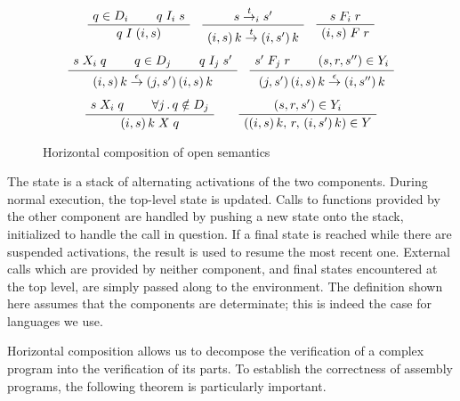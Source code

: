 \documentclass[acmsmall,authordraft]{acmart}
\begin{document}
\begin{figure} %
    \begin{gather*}
        \AxiomC{$q \in D_i$}
        \AxiomC{$q \mathrel{I_i} s$}
        \BinaryInfC{$q \mathrel{I} (i, s)$}
        \DisplayProof
        \quad
        \AxiomC{$s \stackrel{t}{\rightarrow}_i s'$}
        \UnaryInfC{$
            (i, s) \, k
            \stackrel{t}{\rightarrow}
            (i, s') \, k$}
        \DisplayProof
        \quad
        \AxiomC{$s \mathrel{F_i} r$}
        \UnaryInfC{$(i, s) \mathrel{F} r$}
        \DisplayProof
        \\[1ex]
        \AxiomC{$s \mathrel{X_i} q$}
        \AxiomC{$q \in D_j$}
        \AxiomC{$q \mathrel{I_j} s'$}
        \TrinaryInfC{$
            (i, s) \, k
            \stackrel{\epsilon}{\rightarrow}
            (j, s') \, (i, s) \, k$}
        \DisplayProof
        \quad
        \AxiomC{$s' \mathrel{F_j} r$}
        \AxiomC{$(s, r, s'') \in Y_i$}
        \BinaryInfC{$
            (j, s') \, (i, s) \, k
            \stackrel{\epsilon}{\rightarrow}
            (i, s'') \, k$}
        \DisplayProof
        \\[1ex]
        \AxiomC{$s \mathrel{X_i} q$}
        \AxiomC{$\forall j \,.\, q \notin D_j$}
        \BinaryInfC{$(i, s) \, k \mathrel{X} q$}
        \DisplayProof
        \qquad
        \AxiomC{$(s, r, s') \in Y_i$}
        \UnaryInfC{$((i, s) \, k ,\, r ,\, (i, s') \, k) \in Y$}
        \DisplayProof
    \end{gather*}
    \caption{Horizontal composition of open semantics}
    \label{fig:hcomp}
\end{figure}

The state is a stack of alternating activations
of the two components.
During normal execution,
the top-level state is updated.
Calls to functions provided by the other component
are handled by pushing a new state onto the stack,
initialized to handle the call in question.
If a final state is reached
while there are suspended activations,
the result is used to resume the most recent one.
External calls which are provided by neither component,
and final states encountered at the top level,
are simply passed along to the environment.
The definition shown here
assumes that the components are determinate;
this is indeed the case for languages we use.

Horizontal composition
allows us to decompose the verification of a complex program
into the verification of its parts.
To establish the correctness of assembly programs,
the following theorem is particularly important.
\end{document}
